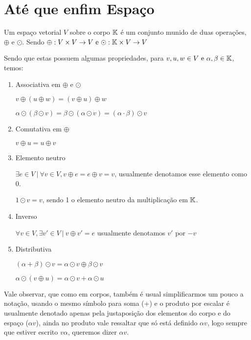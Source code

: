 \section{Até que enfim Espaço}

\begin{defn}

Um espaço vetorial $V$ sobre o corpo $\mathbb{K}$ é um conjunto munido de duas operações, $\oplus$ e $\odot$. Sendo $\oplus: V \times V \to V \text{ e } \odot: \mathbb{K} \times V \to V$



Sendo que estas possuem algumas propriedades, para $v,u,w \in V \text{ e } \alpha, \beta \in \mathbb{K}$, temos:

\begin{enumerate}
    \item Associativa em $\oplus$ e $\odot$
    
        $v \oplus (u \oplus w) = (v \oplus u) \oplus w $
        
        $\alpha \odot (\beta \odot v) = \beta \odot (\alpha \odot v) = (\alpha \cdot \beta)\odot v$
    \item Comutativa em $\oplus$
    
        $v \oplus u = u \oplus v$
    \item Elemento neutro
    
     $\exists e \in V \ | \  \forall v \in V, v \oplus e = e \oplus v = v$, usualmente denotamos esse elemento como 0.
     
     $1 \odot v = v$, sendo 1 o elemento neutro da multiplicação em $\mathbb{K}$.
     
     \item Inverso
     
     $\forall v \in V , \exists v' \in V \ | \ v \oplus v' = e$ usualmente denotamos $v'$ por $-v$ 
    \item Distributiva
    
    $(\alpha + \beta)\odot v = \alpha \odot v \oplus \beta \odot v$
    
    $\alpha \odot (v \oplus u)= \alpha \odot v + \alpha \odot u$
\end{enumerate}
\end{defn}

Vale observar, que como em corpos, também é usual simplificarmos um pouco a notação, usando o mesmo símbolo para soma (+) e o produto por escalar é usualmente denotado apenas pela justaposição dos elementos do corpo e do espaço ($\alpha v$), ainda no produto vale ressaltar que só está definido $\alpha v$, logo sempre que estiver escrito $v \alpha$, queremos dizer $\alpha v$.

